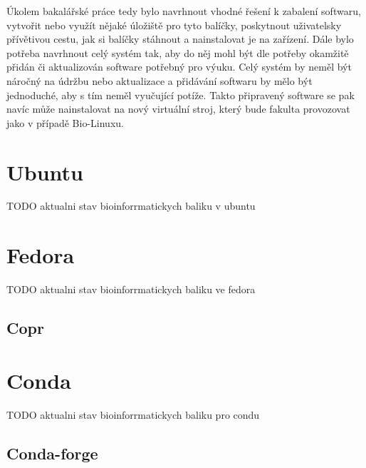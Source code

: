 \documentclass[
  digital,     %
  oneside,     %
  nosansbold,  %
  nocolorbold, %
  lof,         %
  lot,         %
]{fithesis4}
\begin{document}
Úkolem bakalářské práce tedy bylo navrhnout vhodné řešení k
zabalení softwaru, vytvořit nebo využít nějaké úložiště pro tyto balíčky,
poskytnout uživatelsky přívětivou cestu, jak si balíčky stáhnout a nainstalovat je
na zařízení. Dále bylo potřeba navrhnout celý systém tak, aby do něj mohl být dle
potřeby okamžitě přidán či aktualizován software potřebný pro výuku. Celý systém
by neměl být náročný na údržbu nebo aktualizace a přidávání softwaru by mělo být
jednoduché, aby s tím neměl vyučující potíže. Takto připravený software se pak
navíc může nainstalovat na nový virtuální stroj, který bude fakulta provozovat
jako v případě Bio-Linuxu.


\section{Ubuntu}

TODO aktualni stav bioinforrmatickych baliku v ubuntu



\section{Fedora}

TODO aktualni stav bioinforrmatickych baliku ve fedora


\subsection{Copr}


\section{Conda}

TODO aktualni stav bioinforrmatickych baliku pro condu


\subsection{Conda-forge}


\end{document}
